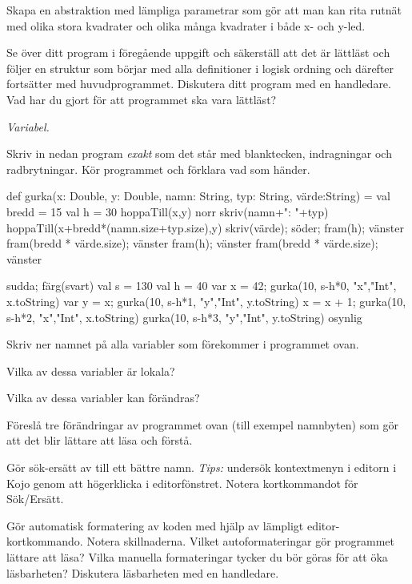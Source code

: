 \Subtask Skapa en abstraktion  med lämpliga parametrar som gör att man kan rita rutnät med olika stora kvadrater och olika många kvadrater i både x- och y-led.

\Subtask\Checkpoint Se över ditt program i föregående uppgift och säkerställ att det är lättläst och följer en struktur som börjar med alla definitioner i logisk ordning och därefter fortsätter med huvudprogrammet. Diskutera ditt program med en handledare. Vad har du gjort för att programmet ska vara lättläst?


\Task \emph{Variabel.}

\Subtask Skriv in nedan program \emph{exakt} som det står med blanktecken, indragningar och radbrytningar. Kör programmet och förklara vad som händer.

\begin{Code}
def gurka(x: Double,
          y: Double, namn: String,
          typ: String,
          värde:String) = {
  val bredd = 15
  val h = 30
  hoppaTill(x,y)
  norr
  skriv(namn+": "+typ)
  hoppaTill(x+bredd*(namn.size+typ.size),y)
  skriv(värde); söder; fram(h); vänster
  fram(bredd * värde.size); vänster
  fram(h); vänster
  fram(bredd * värde.size); vänster
}

sudda; färg(svart)
val s = 130
val h = 40
var x = 42; gurka(10, s-h*0, "x","Int", x.toString)
var y = x;  gurka(10, s-h*1, "y","Int", y.toString)
x = x + 1;  gurka(10, s-h*2, "x","Int", x.toString)
            gurka(10, s-h*3, "y","Int", y.toString)
osynlig
\end{Code}

\Subtask\Pen Skriv ner namnet på alla variabler som förekommer i programmet ovan. 

\Subtask\Pen Vilka av dessa variabler är lokala? 

\Subtask\Pen Vilka av dessa variabler kan förändras?

\Subtask\Pen Föreslå tre förändringar av programmet ovan (till exempel namnbyten) som gör att det blir lättare att läsa och förstå.

\Subtask Gör sök-ersätt av  till ett bättre namn. \emph{Tips:} undersök kontextmenyn i editorn i Kojo genom att högerklicka i editorfönstret. Notera kortkommandot för Sök/Ersätt.

\Subtask\Checkpoint Gör automatisk formatering av koden med hjälp av lämpligt editor-kortkommando. Notera skillnaderna. Vilket autoformateringar gör programmet lättare att läsa? Vilka manuella formateringar tycker du bör göras för att öka läsbarheten? Diskutera läsbarheten med en handledare.

